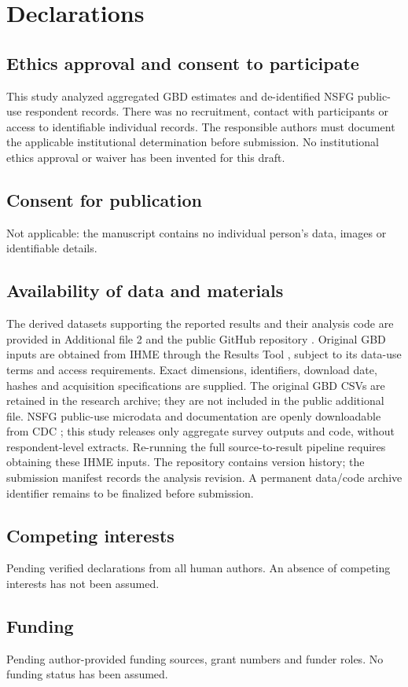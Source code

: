 \documentclass[11pt,a4paper]{article}
\begin{document}
\section*{Declarations}
\subsection*{Ethics approval and consent to participate}
This study analyzed aggregated GBD estimates and de-identified NSFG public-use respondent records. There was no recruitment, contact with participants or access to identifiable individual records. The responsible authors must document the applicable institutional determination before submission. No institutional ethics approval or waiver has been invented for this draft.
\subsection*{Consent for publication}
Not applicable: the manuscript contains no individual person's data, images or identifiable details.
\subsection*{Availability of data and materials}
The derived datasets supporting the reported results and their analysis code are provided in Additional file 2 and the public GitHub repository \cite{repository}. Original GBD inputs are obtained from IHME through the Results Tool \cite{results}, subject to its data-use terms and access requirements. Exact dimensions, identifiers, download date, hashes and acquisition specifications are supplied. The original GBD CSVs are retained in the research archive; they are not included in the public additional file. NSFG public-use microdata and documentation are openly downloadable from CDC \cite{nsfg}; this study releases only aggregate survey outputs and code, without respondent-level extracts. Re-running the full source-to-result pipeline requires obtaining these IHME inputs. The repository contains version history; the submission manifest records the analysis revision. A permanent data/code archive identifier remains to be finalized before submission.
\subsection*{Competing interests}
Pending verified declarations from all human authors. An absence of competing interests has not been assumed.
\subsection*{Funding}
Pending author-provided funding sources, grant numbers and funder roles. No funding status has been assumed.
\end{document}
